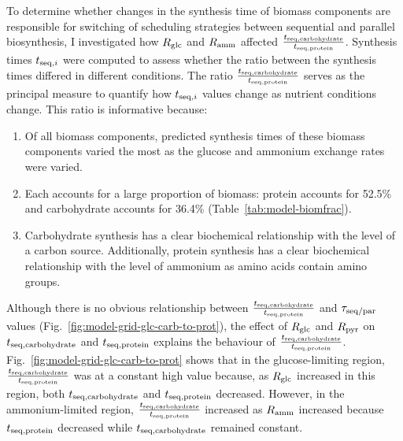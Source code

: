 To determine whether changes in the synthesis time of biomass components are responsible for switching of scheduling strategies between sequential and parallel biosynthesis, I investigated how $R_{\mathrm{glc}}$ and $R_{\mathrm{amm}}$ affected $\frac{t_{\mathrm{seq},\mathrm{carbohydrate}}}{t_{\mathrm{seq},\mathrm{protein}}}$.
Synthesis times $t_{\mathrm{seq},i}$ were computed to assess whether the ratio between the synthesis times differed in different conditions.
The ratio $\frac{t_{\mathrm{seq},\mathrm{carbohydrate}}}{t_{\mathrm{seq},\mathrm{protein}}}$ serves as the principal measure to quantify how $t_{\mathrm{seq},i}$ values change as nutrient conditions change.
This ratio is informative because:
\begin{enumerate}
  \item Of all biomass components, predicted synthesis times of these biomass components varied the most as the glucose and ammonium exchange rates were varied.
  \item Each accounts for a large proportion of biomass: protein accounts for 52.5\% and carbohydrate accounts for 36.4\% (Table~\ref{tab:model-biomfrac}).
  \item Carbohydrate synthesis has a clear biochemical relationship with the level of a carbon source.
        Additionally, protein synthesis has a clear biochemical relationship with the level of ammonium as amino acids contain amino groups.
\end{enumerate}



Although there is no obvious relationship between $\frac{t_{\mathrm{seq},\mathrm{carbohydrate}}}{t_{\mathrm{seq},\mathrm{protein}}}$ and $\tau_{\mathrm{seq}/\mathrm{par}}$ values (Fig.\ \ref{fig:model-grid-glc-carb-to-prot}),
the effect of $R_{\mathrm{glc}}$ and $R_{\mathrm{pyr}}$ on $t_{\mathrm{seq},\mathrm{carbohydrate}}$ and $t_{\mathrm{seq},\mathrm{protein}}$ explains the behaviour of $\frac{t_{\mathrm{seq},\mathrm{carbohydrate}}}{t_{\mathrm{seq},\mathrm{protein}}}$.
Fig.\ \ref{fig:model-grid-glc-carb-to-prot} shows that in the glucose-limiting region, $\frac{t_{\mathrm{seq},\mathrm{carbohydrate}}}{t_{\mathrm{seq},\mathrm{protein}}}$ was at a constant high value because, as $R_{\mathrm{glc}}$ increased in this region, both $t_{\mathrm{seq},\mathrm{carbohydrate}}$ and $t_{\mathrm{seq},\mathrm{protein}}$ decreased.
However, in the ammonium-limited region, $\frac{t_{\mathrm{seq},\mathrm{carbohydrate}}}{t_{\mathrm{seq},\mathrm{protein}}}$ increased as $R_{\mathrm{amm}}$ increased because $t_{\mathrm{seq},\mathrm{protein}}$ decreased while $t_{\mathrm{seq},\mathrm{carbohydrate}}$ remained constant.

